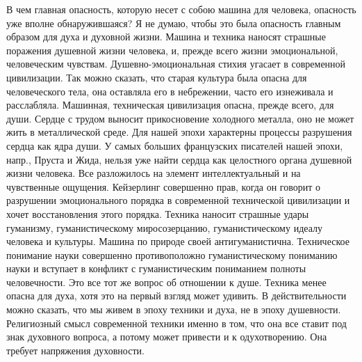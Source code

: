 В чем главная опасность, которую несет с собою машина для человека, опасность 
уже вполне обнаружившаяся? Я не думаю, чтобы это была опасность главным 
образом для духа и духовной жизни. Машина и техника наносят страшные поражения 
душевной жизни человека, и, прежде всего жизни эмоциональной, человеческим 
чувствам. Душевно-эмоциональная стихия угасает в современной цивилизации. 
Так можно сказать, что старая культура была опасна для человеческого тела, она 
оставляла его в небрежении, часто его изнеживала и расслабляла. Машинная, 
техническая цивилизация опасна, прежде всего, для души. Сердце с трудом 
выносит прикосновение холодного металла, оно не может жить в металлической 
среде. Для нашей эпохи характерны процессы разрушения сердца как ядра души. 
У самых больших французских писателей нашей эпохи, напр., Пруста и Жида, 
нельзя уже найти сердца как целостного органа душевной жизни человека. Все 
разложилось на элемент интеллектуальный и на чувственные ощущения. Кейзерлинг 
совершенно прав, когда он говорит о разрушении эмоционального порядка в 
современной технической цивилизации и хочет восстановления этого порядка. 
Техника наносит страшные удары гуманизму, гуманистическому миросозерцанию, 
гуманистическому идеалу человека и культуры. Машина по природе своей 
антигуманистична. Техническое понимание науки совершенно противоположно 
гуманистическому пониманию науки и вступает в конфликт с гуманистическим 
пониманием полноты человечности. Это все тот же вопрос об отношении к душе. 
Техника менее опасна для духа, хотя это на первый взгляд может удивить. В 
действительности можно сказать, что мы живем в эпоху техники и духа, не в 
эпоху душевности. Религиозный смысл современной техники именно в том, что она 
все ставит под знак духовного вопроса, а потому может привести и к 
одухотворению. Она требует напряжения духовности.

